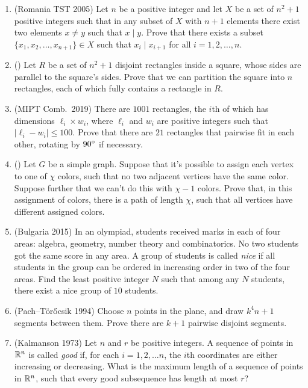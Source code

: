 \documentclass[11pt,paper=letter]{scrartcl}
\begin{document}
\begin{enumerate}

\item (Romania TST 2005) Let $n$ be a positive integer and let $X$ be a set of $n^2+1$ positive integers such that in any subset of $X$ with $n+1$ elements there exist two elements $x\neq y$ such that $x\mid y$. Prove that there exists a subset $\{x_1,x_2,\ldots, x_{n+1} \} \in X$ such that $x_i \mid x_{i+1}$ for all $i=1,2,\ldots, n$.

\item (\href{https://math.stackexchange.com/questions/3689295/how-many-whole-rectangles-can-you-catch-in-a-grid/3704482#3704482}{\!}) Let $R$ be a set of $n^2 + 1$ disjoint rectangles inside a square, whose sides are parallel to the square's sides. Prove that we can partition the square into $n$ rectangles, each of which fully contains a rectangle in $R$. \hint{\ref{h:2}}

\item (MIPT Comb.\ 2019) There are $1001$ rectangles, the $i$th of which has dimensions $\ell_i \times w_i$, where $\ell_i$ and $w_i$ are positive integers such that $|\ell_i - w_i| \le 100$. Prove that there are $21$ rectangles that pairwise fit in each other, rotating by $90^\circ$ if necessary. \hint{\ref{h:1}}

\item (\href{https://yufeizhao.com/olympiad/algcomb.pdf}{\!}) Let $G$ be a simple graph. Suppose that it's possible to assign each vertex to one of $\chi$ colors, such that no two adjacent vertices have the same color. Suppose further that we can't do this with $\chi - 1$ colors. Prove that, in this assignment of colors, there is a path of length $\chi$, such that all vertices have different assigned colors. \hint{\ref{h:3}}

\item (Bulgaria 2015) In an olympiad, students received marks in each of four areas: algebra, geometry, number theory and combinatorics. No two students got the same score in any area. A group of students is called \textit{nice} if all students in the group can be ordered in increasing order in two of the four areas. Find the least positive integer $N$ such that among any $N$ students, there exist a nice group of $10$ students. \hint{\ref{h:12}}

\item (Pach--T\"or\H{o}csik 1994)  Choose $n$ points in the plane, and draw $k^4n + 1$ segments between them. Prove there are $k + 1$ pairwise disjoint segments.

\item (Kalmanson 1973) Let $n$ and $r$ be positive integers. A sequence of points in $\mathbb R^n$ is called \textit{good} if, for each $i = 1, 2, \ldots n$, the $i$th coordinates are either increasing or decreasing. What is the maximum length of a sequence of points in $\mathbb R^n$, such that every good subsequence has length at most $r$? \hint{\ref{h:4}}
\end{enumerate}
\end{document}
